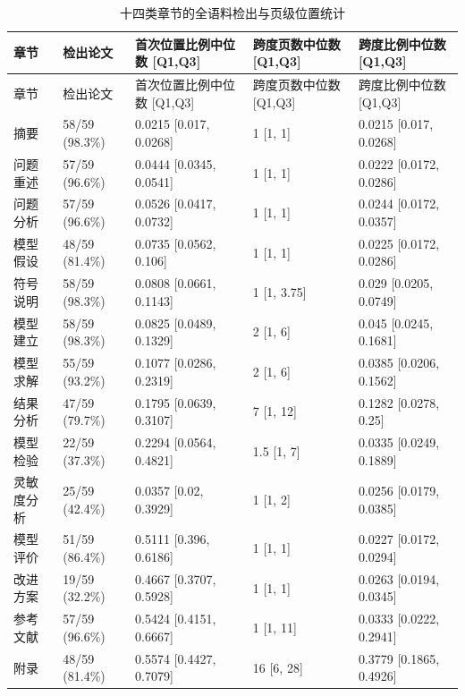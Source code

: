 \newcommand{\CorpusPageMedian}{45}
\newcommand{\CorpusPageIQR}{37--58.5}
\newcommand{\CorpusLineMedian}{38}
\newcommand{\CorpusParagraphMedian}{6}
\newcommand{\CorpusFallbackPages}{2232}
\newcommand{\CorpusUnconfirmedPages}{1770}
\newcommand{\CorpusSectionSummary}{十四类章节的检出率和页级跨度见表~\ref{tab:section-stats}}
\newcommand{\CorpusLayoutSummary}{每篇图表标题候选数的中位数及四分位范围为 17 [14, 23]，公式行候选对应为 420 [228.5, 511.5]；两类候选页在全文相对位置的中位数分别为 29.8\% 和 56.9\%。}
\newcommand{\CorpusTypeSummary}{A 类总页数 44.5 [36.5, 58] 页，模型组检出前三项为 机理与数值 15 篇、规划与智能优化 13 篇、时序预测 3 篇；B 类总页数 42 [34, 55] 页，模型组检出前三项为 机理与数值 12 篇、规划与智能优化 10 篇、统计学习 6 篇；C 类总页数 52 [43.25, 60.25] 页，模型组检出前三项为 时序预测 17 篇、规划与智能优化 17 篇、统计学习 13 篇。}

\begin{longtable}{p{2.0cm}p{3.1cm}p{3.0cm}p{3.0cm}p{3.0cm}}
\caption{十四类章节的全语料检出与页级位置统计}\label{tab:section-stats}\\
\toprule
章节 & 检出论文 & 首次位置比例中位数 [Q1,Q3] & 跨度页数中位数 [Q1,Q3] & 跨度比例中位数 [Q1,Q3]\\
\midrule
\endfirsthead
\toprule
章节 & 检出论文 & 首次位置比例中位数 [Q1,Q3] & 跨度页数中位数 [Q1,Q3] & 跨度比例中位数 [Q1,Q3]\\
\midrule
\endhead
摘要 & 58/59 (98.3\%) & 0.0215 [0.017, 0.0268] & 1 [1, 1] & 0.0215 [0.017, 0.0268] \\
问题重述 & 57/59 (96.6\%) & 0.0444 [0.0345, 0.0541] & 1 [1, 1] & 0.0222 [0.0172, 0.0286] \\
问题分析 & 57/59 (96.6\%) & 0.0526 [0.0417, 0.0732] & 1 [1, 1] & 0.0244 [0.0172, 0.0357] \\
模型假设 & 48/59 (81.4\%) & 0.0735 [0.0562, 0.106] & 1 [1, 1] & 0.0225 [0.0172, 0.0286] \\
符号说明 & 58/59 (98.3\%) & 0.0808 [0.0661, 0.1143] & 1 [1, 3.75] & 0.029 [0.0205, 0.0749] \\
模型建立 & 58/59 (98.3\%) & 0.0825 [0.0489, 0.1329] & 2 [1, 6] & 0.045 [0.0245, 0.1681] \\
模型求解 & 55/59 (93.2\%) & 0.1077 [0.0286, 0.2319] & 2 [1, 6] & 0.0385 [0.0206, 0.1562] \\
结果分析 & 47/59 (79.7\%) & 0.1795 [0.0639, 0.3107] & 7 [1, 12] & 0.1282 [0.0278, 0.25] \\
模型检验 & 22/59 (37.3\%) & 0.2294 [0.0564, 0.4821] & 1.5 [1, 7] & 0.0335 [0.0249, 0.1889] \\
灵敏度分析 & 25/59 (42.4\%) & 0.0357 [0.02, 0.3929] & 1 [1, 2] & 0.0256 [0.0179, 0.0385] \\
模型评价 & 51/59 (86.4\%) & 0.5111 [0.396, 0.6186] & 1 [1, 1] & 0.0227 [0.0172, 0.0294] \\
改进方案 & 19/59 (32.2\%) & 0.4667 [0.3707, 0.5928] & 1 [1, 1] & 0.0263 [0.0194, 0.0345] \\
参考文献 & 57/59 (96.6\%) & 0.5424 [0.4151, 0.6667] & 1 [1, 11] & 0.0333 [0.0222, 0.2941] \\
附录 & 48/59 (81.4\%) & 0.5574 [0.4427, 0.7079] & 16 [6, 28] & 0.3779 [0.1865, 0.4926] \\
\bottomrule
\end{longtable}
